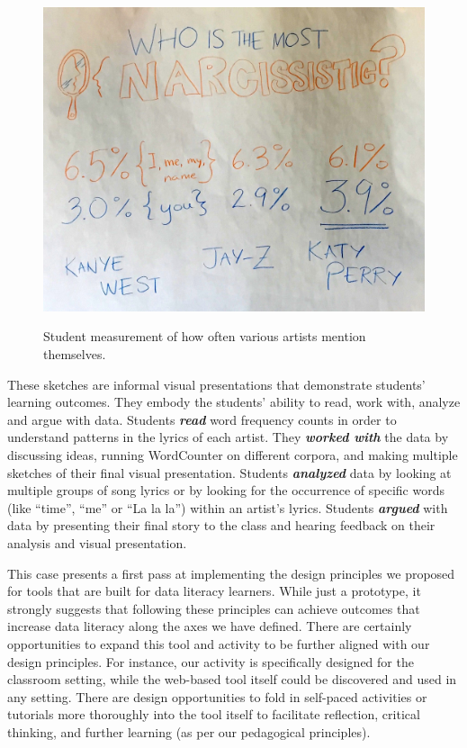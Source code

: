 \documentclass{acm_proc_article-sp}
\begin{document}
\begin{figure}[h]
\caption{Student measurement of how often various artists mention themselves.}
\includegraphics[width=\linewidth]{narcissism}
\label{fig:narcissism}
\end{figure}

These sketches are informal visual presentations that demonstrate students' learning outcomes. They embody the students' ability to read, work with, analyze and argue with data. Students \textbf{\textit{read}} word frequency counts in order to understand patterns in the lyrics of each artist. They \textbf{\textit{worked with}} the data by discussing ideas, running WordCounter on different corpora, and making multiple sketches of their final visual presentation. Students \textbf{\textit{analyzed}} data by looking at multiple groups of song lyrics or by looking for the occurrence of specific words (like \enquote{time}, \enquote{me} or \enquote{La la la}) within an artist's lyrics.  Students \textbf{\textit{argued}} with data by presenting their final story to the class and hearing feedback on their analysis and visual presentation.

This case presents a first pass at implementing the design principles we proposed for tools that are built for data literacy learners.  While just a prototype, it strongly suggests that following these principles can achieve outcomes that increase data literacy along the axes we have defined.  There are certainly opportunities to expand this tool and activity to be further aligned with our design principles.  For instance, our activity is specifically designed for the classroom setting, while the web-based tool itself could be discovered and used in any setting.  There are design opportunities to fold in self-paced activities or tutorials more thoroughly into the tool itself to facilitate reflection, critical thinking, and further learning (as per our pedagogical principles).
\end{document}
